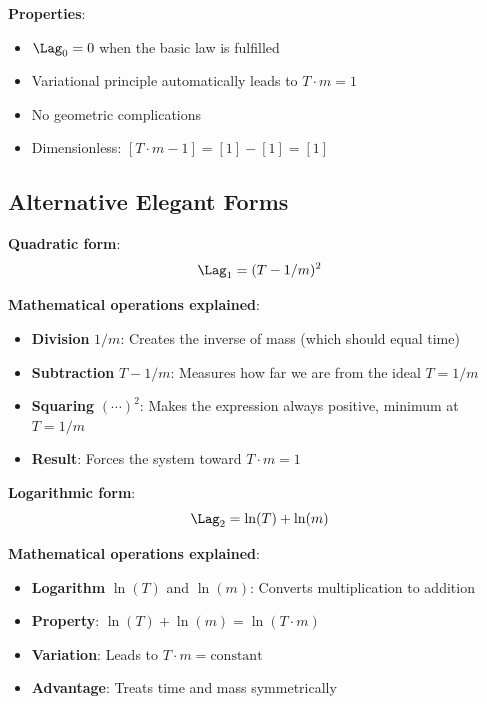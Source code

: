 	\textbf{Properties}:
	\begin{itemize}
		\item $\Lag_0 = 0$ when the basic law is fulfilled
		\item Variational principle automatically leads to $T \cdot m = 1$
		\item No geometric complications
		\item Dimensionless: $[T \cdot m - 1] = [1] - [1] = [1]$
	\end{itemize}
	
	\subsection{Alternative Elegant Forms}
	
	\textbf{Quadratic form}:
	\begin{equation}
		\Lag_1 = (T - 1/m)^2
		\label{eq:quadratic_form}
	\end{equation}
	
	\textbf{Mathematical operations explained}:
	\begin{itemize}
		\item \textbf{Division} $1/m$: Creates the inverse of mass (which should equal time)
		\item \textbf{Subtraction} $T - 1/m$: Measures how far we are from the ideal $T = 1/m$
		\item \textbf{Squaring} $(\cdots)^2$: Makes the expression always positive, minimum at $T = 1/m$
		\item \textbf{Result}: Forces the system toward $T \cdot m = 1$
	\end{itemize}
	
	\textbf{Logarithmic form}:
	\begin{equation}
		\Lag_2 = \ln(T) + \ln(m)
		\label{eq:logarithmic_form}
	\end{equation}
	
	\textbf{Mathematical operations explained}:
	\begin{itemize}
		\item \textbf{Logarithm} $\ln(T)$ and $\ln(m)$: Converts multiplication to addition
		\item \textbf{Property}: $\ln(T) + \ln(m) = \ln(T \cdot m)$
		\item \textbf{Variation}: Leads to $T \cdot m = \text{constant}$
		\item \textbf{Advantage}: Treats time and mass symmetrically
	\end{itemize}
	

